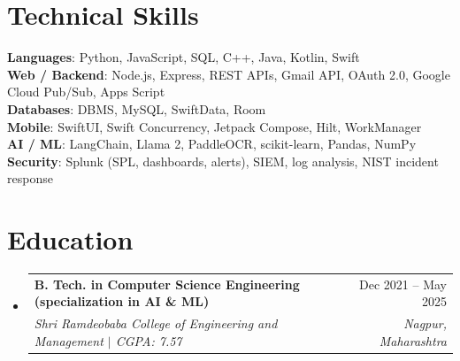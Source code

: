 \documentclass[a4paper,11pt]{article}
\makeatletter
\newcommand{\resumeSubheading}[4]{
  \vspace{-1pt}\item
    \begin{tabularx}{0.97\textwidth}[t]{@{}>{\raggedright\arraybackslash}X@{\hspace{0.75em}}r@{}}
      \textbf{#1} & #2 \\
      \textit{\small#3} & \textit{\small #4} \\
    \end{tabularx}\vspace{-3pt}
}
\newcommand{\resumeSubItemListStart}{\begin{itemize}[leftmargin=0.15in, label={}]}
\newcommand{\resumeSubItemListEnd}{\end{itemize}}
\makeatother
\begin{document}
\section{Technical Skills}
  \begin{itemize}[leftmargin=0.15in, label={}]
    \small{\item{
      \textbf{Languages}{: Python, JavaScript, SQL, C++, Java, Kotlin, Swift} \\
      \textbf{Web / Backend}{: Node.js, Express, REST APIs, Gmail API, OAuth 2.0, Google Cloud Pub/Sub, Apps Script} \\
      \textbf{Databases}{: DBMS, MySQL, SwiftData, Room} \\
      \textbf{Mobile}{: SwiftUI, Swift Concurrency, Jetpack Compose, Hilt, WorkManager} \\
      \textbf{AI / ML}{: LangChain, Llama 2, PaddleOCR, scikit-learn, Pandas, NumPy} \\
      \textbf{Security}{: Splunk (SPL, dashboards, alerts), SIEM, log analysis, NIST incident response}
    }}
  \end{itemize}

\section{Education}
  \resumeSubItemListStart
    \resumeSubheading
      {B. Tech. in Computer Science Engineering (specialization in AI \& ML)}{Dec 2021 -- May 2025}
      {Shri Ramdeobaba College of Engineering and Management $|$ CGPA: 7.57}{Nagpur, Maharashtra}
  \resumeSubItemListEnd
\end{document}
